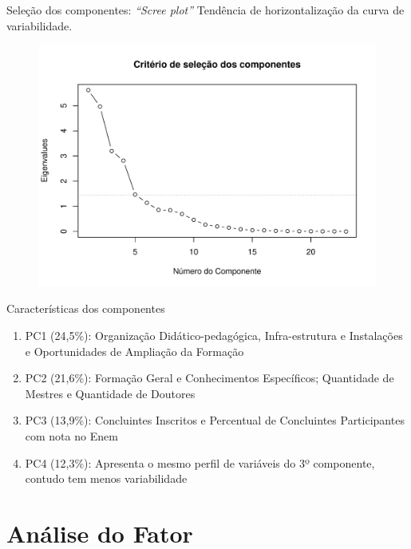\documentclass{beamer}
\begin{document}
\begin{frame}{Seleção dos componentes: \textit{``Scree plot''}}
	Tendência de horizontalização da curva de variabilidade.
	\begin{figure}[H]
			\centering
			\includegraphics[scale=.50]{../graficos/latex-graph-scree-plot-pca.pdf}
	\end{figure}
\end{frame}

\begin{frame}{Características dos componentes}
	\begin{enumerate}
	\item PC1 (24,5\%): Organização Didático-pedagógica, Infra-estrutura e Instalações e Oportunidades de Ampliação da Formação
	\item PC2 (21,6\%): Formação Geral e Conhecimentos Específicos; Quantidade de Mestres e Quantidade de Doutores
	\item PC3 (13,9\%): Concluintes Inscritos e Percentual de Concluintes Participantes com nota no Enem
	\item PC4 (12,3\%): Apresenta o mesmo perfil de variáveis do 3º componente, contudo tem menos variabilidade
	\end{enumerate}
\end{frame}

\section{Análise do Fator}
\end{document}
